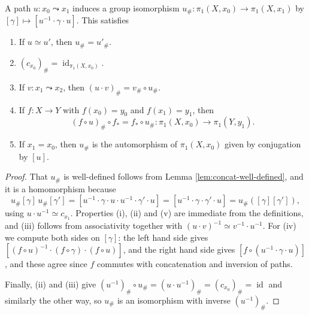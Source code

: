 \documentclass[a4paper]{scrartcl}
\newcommand{\id}{\operatorname{id}}
\begin{document}
\begin{proposition} \label{prop:change-basepoint}
	A path $u: x_0 \leadsto x_1$ induces a group isomorphism $u_\#: \pi_1(X, x_0) \rightarrow \pi_1(X, x_1)$ by $[\gamma] \mapsto [u^{-1} \cdot \gamma \cdot u]$. This satisfies
	\begin{enumerate}
		\item If $u \simeq u'$, then $u_\# = u'_\#$.
		\item $(c_{x_0})_\# = \id_{\pi_1(X, x_0)}$.
		\item If $v: x_1 \leadsto x_2$, then $(u \cdot v)_\# = v_\# \circ u_\#$.
		\item If $f: X \rightarrow Y$ with $f(x_0) = y_0$ and $f(x_1) = y_1$, then
		$$
		(f\circ u)_\# \circ f_* = f_* \circ u_\#: \pi_1(X, x_0) \rightarrow \pi_1(Y, y_1).
		$$
		\item If $x_1 = x_0$, then $u_\#$ is the automorphism of $\pi_1(X, x_0)$ given by conjugation by $[u]$.
	\end{enumerate}
\end{proposition}
\begin{proof}
	That $u_\#$ is well-defined follows from Lemma \ref{lem:concat-well-defined}, and it is a homomorphism because
	$$
	u_\#[\gamma] \, u_\#[\gamma'] = [u^{-1}\cdot\gamma\cdot u \cdot u^{-1} \cdot \gamma' \cdot u] = [u^{-1} \cdot \gamma \cdot \gamma' \cdot u] = u_\#([\gamma][\gamma']),
	$$
	using $u \cdot u^{-1} \simeq c_{x_1}$. Properties (i), (ii) and (v) are immediate from the definitions, and (iii) follows from associativity together with $(u\cdot v)^{-1} \simeq v^{-1} \cdot u^{-1}$. For (iv) we compute both sides on $[\gamma]$: the left hand side gives $[(f\circ u)^{-1} \cdot (f \circ \gamma) \cdot (f \circ u)]$, and the right hand side gives $[f \circ (u^{-1}\cdot\gamma\cdot u)]$, and these agree since $f$ commutes with concatenation and inversion of paths.

	Finally, (ii) and (iii) give $(u^{-1})_\# \circ u_\# = (u \cdot u^{-1})_\# = (c_{x_0})_\# = \id$ and similarly the other way, so $u_\#$ is an isomorphism with inverse $(u^{-1})_\#$.
\end{proof}

\begin{center}
\end{center}
\end{document}

